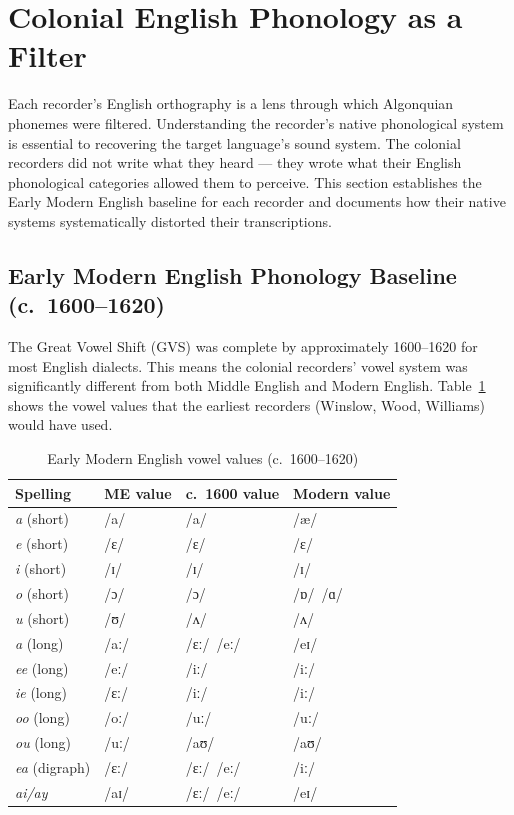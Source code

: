 
\section{Colonial English Phonology as a Filter}
\label{sec:colonial-phonology}

Each recorder's English orthography is a lens through which Algonquian
phonemes were filtered. Understanding the recorder's native phonological
system is essential to recovering the target language's sound system. The
colonial recorders did not write what they heard --- they wrote what their
English phonological categories allowed them to perceive. This section
establishes the Early Modern English baseline for each recorder and
documents how their native systems systematically distorted their
transcriptions.

\subsection{Early Modern English Phonology Baseline (c.\ 1600--1620)}

The Great Vowel Shift (GVS) was complete by approximately 1600--1620 for
most English dialects. This means the colonial recorders' vowel system was
significantly different from both Middle English and Modern English.
Table~\ref{tab:eme-vowels} shows the vowel values that the earliest
recorders (Winslow, Wood, Williams) would have used.

\begin{table}[h]
\centering
\caption{Early Modern English vowel values (c.\ 1600--1620)}
\label{tab:eme-vowels}
\begin{tabular}{llll}
\toprule
\textbf{Spelling} & \textbf{ME value} & \textbf{c.\ 1600 value} & \textbf{Modern value} \\
\midrule
\textit{a} (short) & /a/ & /a/ & /æ/ \\
\textit{e} (short) & /ɛ/ & /ɛ/ & /ɛ/ \\
\textit{i} (short) & /ɪ/ & /ɪ/ & /ɪ/ \\
\textit{o} (short) & /ɔ/ & /ɔ/ & /ɒ/~/ɑ/ \\
\textit{u} (short) & /ʊ/ & /ʌ/ & /ʌ/ \\
\textit{a} (long) & /aː/ & /ɛː/~/eː/ & /eɪ/ \\
\textit{ee} (long) & /eː/ & /iː/ & /iː/ \\
\textit{ie} (long) & /ɛː/ & /iː/ & /iː/ \\
\textit{oo} (long) & /oː/ & /uː/ & /uː/ \\
\textit{ou} (long) & /uː/ & /aʊ/ & /aʊ/ \\
\textit{ea} (digraph) & /ɛː/ & /ɛː/~/eː/ & /iː/ \\
\textit{ai/ay} & /aɪ/ & /ɛː/~/eː/ & /eɪ/ \\
\bottomrule
\end{tabular}
\end{table}

